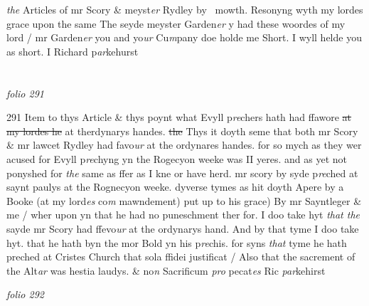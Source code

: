 \documentclass[12pt, a4paper]{book}
\begin{document}
               \textit{the} Articles of mr Scory \& meyst\textit{er} Rydley by  mowth. Resonyng wyth my lordes grace upon the same The seyde meyster Garden\textit{er}
               y
			 had these woordes of my lord / mr Garden\textit{er} you and yo\textit{ur} Cu\textit{m}pany doe holde me Short. I wyll helde you as short. I Richard p\textit{ar}kehurst

\dotfill
					  \section*{}  \subsection*{}

\textit{folio 291}



{\color{Mahogany}291} Item to thys Article \& thys poynt what Evyll p\textit{re}chers hath had ffawore \sout{at  my lordes he} at therdynarys handes. \sout{the} Thys it doyth seme that both mr Scory \& mr lawcet Rydley had favo\textit{ur} at the ordynares handes. for so mych as they wer acused for Evyll p\textit{re}chyng yn the Rogecyon weeke was II yeres. and as yet not ponyshed for \textit{the} same as ffer as I kne or have herd. mr scory by syde p\textit{re}ched at saynt paulys at the Rognecyon weeke. dyverse tymes as hit doyth Apere by a Booke (at my lord\textit{es} co\textit{m} mawndement) put up to his grace) By mr Sayntleger \& me / wher upon yn that he had no puneschment ther for. I doo take hyt \textit{that the} sayde mr Scory had ffevo\textit{ur} at the ordynarys hand. And by that tyme I doo take hyt. that he hath byn the mor Bold yn his p\textit{re}chis. for syns \textit{that} tyme he hath preched at Cristes Church that sola ffidei justificat / Also that the sacrement of the Alt\textit{ar} was hestia laudys. \& no\textit{n} Sacrificum \textit{pro} pecat\textit{es}  Ric \textit{par}kehirst

\dotfill
					

\textit{folio 292}


         \vspace{4cm}
         
\dotfill
					  \section*{}  \subsection*{}
\end{document}
